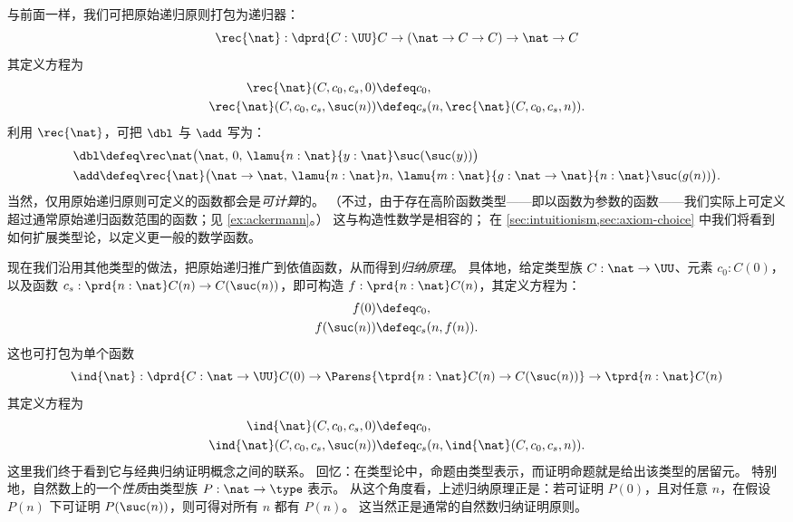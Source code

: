 与前面一样，我们可把原始递归原则打包为递归器：
\[\rec{\nat}  : \dprd{C:\UU} C \to (\nat \to C \to C) \to \nat \to C \]
其定义方程为
%
\begin{align*}
\rec{\nat}(C,c_0,c_s,0)  &\defeq c_0, \\
\rec{\nat}(C,c_0,c_s,\suc(n)) &\defeq c_s(n,\rec{\nat}(C,c_0,c_s,n)).
\end{align*}
利用 $\rec{\nat}$，可把 $\dbl$ 与 $\add$ 写为：
\begin{align}
\dbl &\defeq \rec\nat\big(\nat,\, 0,\, \lamu{n:\nat}{y:\nat} \suc(\suc(y))\big) \label{eq:dbl-as-rec}\\
\add &\defeq \rec{\nat}\big(\nat \to \nat,\, \lamu{n:\nat} n,\, \lamu{m:\nat}{g:\nat \to \nat}{n :\nat} \suc(g(n))\big).
\end{align}
当然，仅用原始递归原则可定义的函数都会是\emph{可计算}的。
（不过，由于存在高阶函数类型——即以函数为参数的函数——我们实际上可定义超过通常原始递归函数范围的函数；见 \cref{ex:ackermann}。）
这与构造性数学是相容的；
%
在 \cref{sec:intuitionism,sec:axiom-choice} 中我们将看到如何扩展类型论，以定义更一般的数学函数。

现在我们沿用其他类型的做法，把原始递归推广到依值函数，从而得到\emph{归纳原理}。
具体地，给定类型族 $C : \nat \to \UU$、元素 $c_0 : C(0)$，以及函数 $c_s : \prd{n:\nat} C(n) \to C(\suc(n))$，即可构造 $f : \prd{n:\nat} C(n)$，其定义方程为：
\begin{align*}
  f(0) &\defeq c_0, \\
  f(\suc(n)) &\defeq c_s(n,f(n)).
\end{align*}
这也可打包为单个函数
%
\[\ind{\nat}  : \dprd{C:\nat\to \UU} C(0) \to \Parens{\tprd{n : \nat} C(n) \to C(\suc(n))} \to \tprd{n : \nat} C(n) \]
其定义方程为
\begin{align*}
\ind{\nat}(C,c_0,c_s,0)  &\defeq c_0, \\
\ind{\nat}(C,c_0,c_s,\suc(n)) &\defeq c_s(n,\ind{\nat}(C,c_0,c_s,n)).
\end{align*}
这里我们终于看到它与经典归纳证明概念之间的联系。
回忆：在类型论中，命题由类型表示，而证明命题就是给出该类型的居留元。
特别地，自然数上的一个\emph{性质}由类型族 $P:\nat\to\type$ 表示。
从这个角度看，上述归纳原理正是：若可证明 $P(0)$，且对任意 $n$，在假设 $P(n)$ 下可证明 $P(\suc(n))$，则可得对所有 $n$ 都有 $P(n)$。
这当然正是通常的自然数归纳证明原则。

